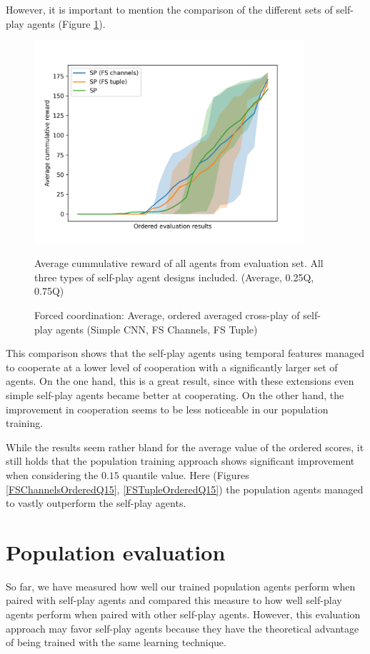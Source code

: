However, it is important to mention the comparison of the different sets of self-play agents (Figure \ref{FSVariantsOrderedAvg}).
\begin{figure}[!ht]
    \centering
    \includegraphics*[width=10cm]{../img/FSVariantsOrderedAvg.png}

    \caption{Forced coordination: Average, ordered averaged cross-play of self-play agents (Simple CNN, FS Channels, FS Tuple)}
    \label{FSVariantsOrderedAvg}
    \medskip
    \small 
    Average cummulative reward of all agents from evaluation set.
    All three types of self-play agent designs included.
    (Average, 0.25Q, 0.75Q)

\end{figure}
This comparison shows that the self-play agents using temporal features managed to cooperate at a lower level of cooperation with a significantly larger set of agents.
On the one hand, this is a great result, since with these extensions even simple self-play agents became better at cooperating.
On the other hand, the improvement in cooperation seems to be less noticeable in our population training.

While the results seem rather bland for the average value of the ordered scores, it still holds that the population training approach shows significant improvement when considering the $0.15$ quantile value.
Here (Figures \ref{FSChannelsOrderedQ15}, \ref{FSTupleOrderedQ15}) the population agents managed to vastly outperform the self-play agents.



\section{Population evaluation}
So far, we have measured how well our trained population agents perform when paired with self-play agents and compared this measure to how well self-play agents perform when paired with other self-play agents.
However, this evaluation approach may favor self-play agents because they have the theoretical advantage of being trained with the same learning technique.

